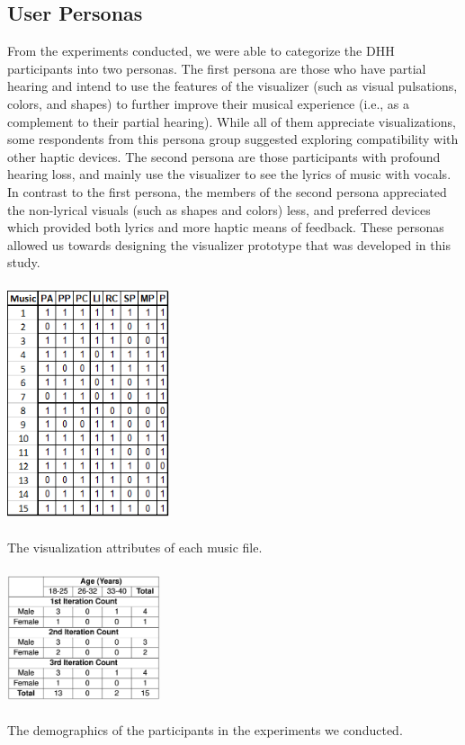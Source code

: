 \documentclass{sigchi-ext}
\begin{document}
\subsection{User Personas}
From the experiments conducted, we were able to categorize the DHH participants into two personas. The first persona are those who have partial hearing and intend to use the features of the visualizer (such as visual pulsations, colors, and shapes) to further improve their musical experience (i.e., as a complement to their partial hearing). While all of them appreciate visualizations, some respondents from this persona group suggested exploring compatibility with other haptic devices. The second persona are those participants with profound hearing loss, and mainly use the visualizer to see the lyrics of music with vocals. In contrast to the first persona, the members of the second persona appreciated the non-lyrical visuals (such as shapes and colors) less, and preferred devices which provided both lyrics and more haptic means of feedback. These personas allowed us towards designing the visualizer prototype that was developed in this study. 

\begin{marginfigure}[-20pc]
\begin{minipage}{\marginparwidth}
     \includegraphics[width=4.75cm,height=7cm]{figures/Visualizations.png}
    \caption{The visualization attributes of each music file.}
    \label{fig:visualizations}
    \end{minipage}
\end{marginfigure}

\begin{marginfigure}[1pc]
\begin{minipage}{\marginparwidth}
     \includegraphics[width=4.5cm,height=4cm]{figures/demographic.png}
    \caption{The demographics of the participants in the experiments we conducted.}
    \label{fig:demographic}
    \end{minipage}
\end{marginfigure}
\end{document}
